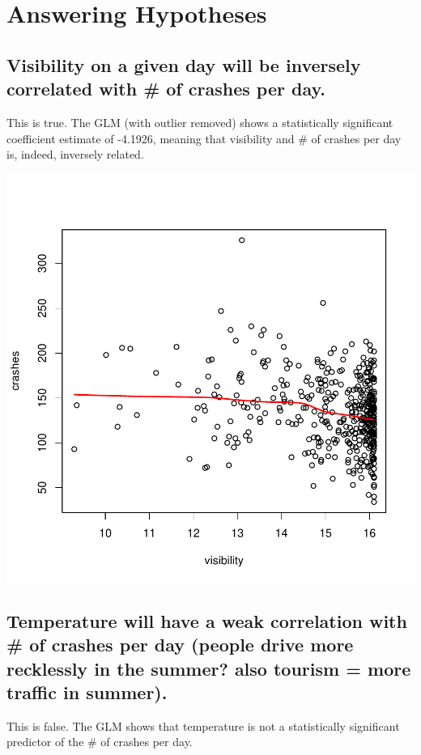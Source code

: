 \documentclass[11pt, a4paper]{article}
\begin{document}
\pagebreak
\section{Answering Hypotheses}

\subsection{Visibility on a given day will be inversely correlated with \# of crashes per day.}

This is true. The GLM (with outlier removed) shows a statistically significant coefficient estimate of -4.1926, meaning that visibility and \# of crashes per day is, indeed, inversely related. 

\includegraphics{regression-044}


\pagebreak
\subsection{Temperature will have a weak correlation with \# of crashes per day (people drive more recklessly in the summer? also tourism = more traffic in summer).}


This is false. The GLM shows that temperature is not a statistically significant predictor of the \# of crashes per day. 
\end{document}
